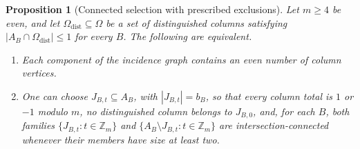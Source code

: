 \documentclass[11pt,reqno]{amsart}
\numberwithin{equation}{section}
\newtheorem{proposition}[theorem]{Proposition}
\theoremstyle{definition}
\theoremstyle{remark}
\newcommand{\Zm}{\mathbb Z_m}
\newcommand{\cO}{\Omega}
\begin{document}
\begin{proposition}[Connected selection with prescribed exclusions]\label{prop:pinned-selection}
Let $m\ge4$ be even, and let $\cO_\mathrm{dist}\subseteq\cO$ be a set of
distinguished columns satisfying
$|A_B\cap\cO_\mathrm{dist}|\le1$ for every $B$. The following are equivalent.
\begin{enumerate}
\item Each component of the incidence graph contains an even number of column
vertices.
\item One can choose $J_{B,t}\subseteq A_B$, with $|J_{B,t}|=b_B$, so that every
column total is $1$ or $-1$ modulo $m$, no distinguished column belongs to $J_{B,0}$,
and, for each $B$, both families
$\{J_{B,t}:t\in\Zm\}$ and $\{A_B\setminus J_{B,t}:t\in\Zm\}$ are
intersection-connected whenever their members have size at least two.
\end{enumerate}
\end{proposition}
\end{document}
